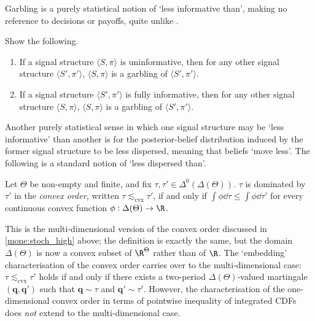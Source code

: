 Garbling is a purely statistical notion of `less informative than', making no reference to decisions or payoffs, quite unlike .

\begin{namedthm}[\Cref*{exercise:fullnoinfo} {\normalfont (continued).}]
	\label{exercise:fullnoinfo_garb}
	Show the following.

	\begin{enumerate}[label=(\alph*)]

		\item If a signal structure $\langle S, \pi \rangle $ is uninformative, then for any other signal structure $\langle S', \pi' \rangle $, $\langle S, \pi \rangle $ is a garbling of $\langle S', \pi' \rangle $.
	
		\item If a signal structure $\langle S', \pi' \rangle $ is fully informative, then for any other signal structure $\langle S, \pi \rangle $, $\langle S, \pi \rangle $ is a garbling of $\langle S', \pi' \rangle $.
	
	\end{enumerate}
\end{namedthm}

Another purely statistical sense in which one signal structure may be `less informative' than another is for the posterior-belief distribution induced by the former signal structure to be less dispersed, meaning that beliefs `move less'. The following is a standard notion of `less dispersed than'.

\begin{definition}
	\label{definition:belief_dispersed}
	Let $\Theta$ be non-empty and finite, and fix $\tau,\tau' \in \Delta^0(\Delta(\Theta))$. $\tau$ is dominated by $\tau'$ in the \emph{convex order,} written $\tau \lesssim_{\text{cvx}} \tau'$, if and only if $\int \phi \dd \tau \leq \int \phi \dd \tau'$ for every continuous convex function $\phi : \Delta(\Theta) \to \R$.
\end{definition}

This is the multi-dimensional version of the convex order discussed in \cref{mone:stoch_high} above; the definition is exactly the same, but the domain $\Delta(\Theta)$ is now a convex subset of $\R^\Theta$ rather than of $\R$. The `embedding' characterisation of the convex order carries over to the multi-dimensional case: $\tau \lesssim_{\text{cvx}} \tau'$ holds if and only if there exists a two-period $\Delta(\Theta)$-valued martingale $(\boldsymbol{q},\boldsymbol{q'})$ such that $\boldsymbol{q} \sim \tau$ and $\boldsymbol{q'} \sim \tau'$. However, the characterisation of the one-dimensional convex order in terms of pointwise inequality of integrated CDFs does \emph{not} extend to the multi-dimensional case.

